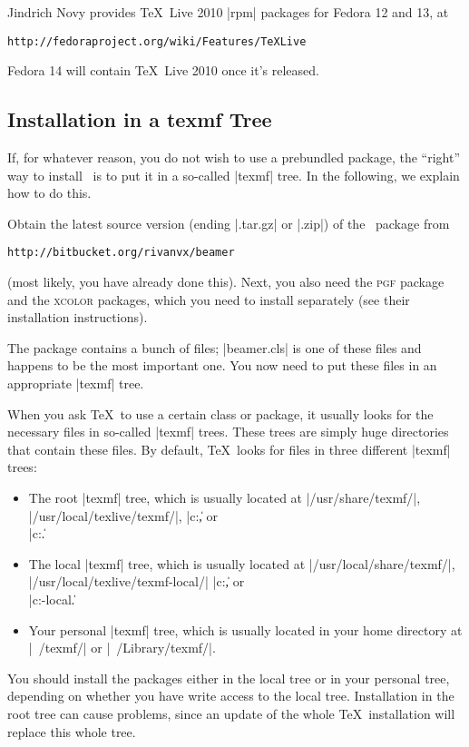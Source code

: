 Jindrich Novy provides \TeX\ Live 2010 |rpm| packages for Fedora 12 and 13, at
\begin{verbatim}
http://fedoraproject.org/wiki/Features/TeXLive
\end{verbatim}
Fedora 14 will contain \TeX\ Live 2010 once it's released.


\subsection{Installation in a texmf Tree}

If, for whatever reason, you do not wish to use a prebundled package, the ``right'' way to install \beamer\ is to put it in a so-called |texmf| tree. In the following, we explain how to do this.

Obtain the latest source version (ending |.tar.gz| or |.zip|) of the \beamer\ package from
\begin{verbatim}
http://bitbucket.org/rivanvx/beamer
\end{verbatim}
(most likely, you have already done this). Next, you also need the \textsc{pgf} package and the \textsc{xcolor} packages, which you need to install separately (see their installation instructions).

The package contains a bunch of files; |beamer.cls| is one of these files and happens to be the most important one. You now need to put these files in an appropriate |texmf| tree.

When you ask \TeX\ to use a certain class or package, it usually looks for the necessary files in so-called |texmf| trees. These trees are simply huge directories that contain these files. By default, \TeX\ looks for files in three different |texmf| trees:
\begin{itemize}
\item
  The root |texmf| tree, which is usually located at |/usr/share/texmf/|, |/usr/local/texlive/texmf/|, |c:\texmf\|, or\\ |c:\texlive\texmf\|.
\item
  The local  |texmf| tree, which is usually located at |/usr/local/share/texmf/|, |/usr/local/texlive/texmf-local/| |c:\localtexmf\|, or\\ |c:\texlive\texmf-local\|.
\item
  Your personal |texmf| tree, which is usually located in your home directory at |~/texmf/| or |~/Library/texmf/|.
\end{itemize}

You should install the packages either in the local tree or in your personal tree, depending on whether you have write access to the local tree. Installation in the root tree can cause problems, since an update of the whole \TeX\ installation will replace this whole tree.

